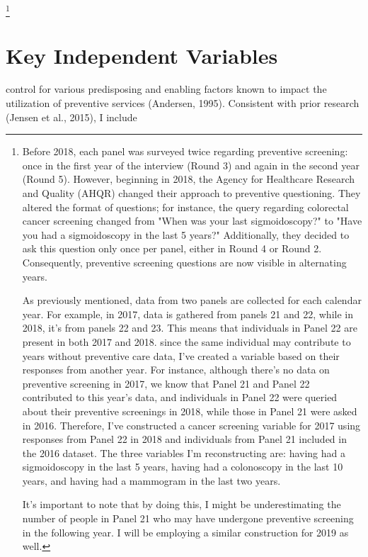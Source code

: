 \documentclass[../main.tex]{subfiles}
\begin{document}
\footnote{Before 2018, each panel was surveyed twice regarding preventive screening: once in the first year of the interview (Round 3) and again in the second year (Round 5). However, beginning in 2018, the Agency for Healthcare Research and Quality (AHQR) changed their approach to preventive questioning. They altered the format of questions; for instance, the query regarding colorectal cancer screening changed from "When was your last sigmoidoscopy?" to "Have you had a sigmoidoscopy in the last 5 years?" Additionally, they decided to ask this question only once per panel, either in Round 4 or Round 2. Consequently, preventive screening questions are now visible in alternating years.

As previously mentioned, data from two panels are collected for each calendar year. For example, in 2017, data is gathered from panels 21 and 22, while in 2018, it's from panels 22 and 23. This means that individuals in Panel 22 are present in both 2017 and 2018. since the same individual may contribute to years without preventive care data, I've created a variable based on their responses from another year. For instance, although there's no data on preventive screening in 2017, we know that Panel 21 and Panel 22 contributed to this year's data, and individuals in Panel 22 were queried about their preventive screenings in 2018, while those in Panel 21 were asked in 2016. Therefore, I've constructed a cancer screening variable for 2017 using responses from Panel 22 in 2018 and individuals from Panel 21 included in the 2016 dataset. The three variables I'm reconstructing are: having had a sigmoidoscopy in the last 5 years, having had a colonoscopy in the last 10 years, and having had a mammogram in the last two years.

It's important to note that by doing this, I might be underestimating the number of people in Panel 21 who may have undergone preventive screening in the following year. I will be employing a similar construction for 2019 as well.}


\section{Key Independent Variables}


 control for various predisposing and enabling factors known to impact the utilization of preventive services (Andersen, 1995). Consistent with prior research (Jensen et al., 2015), I include
\end{document}
